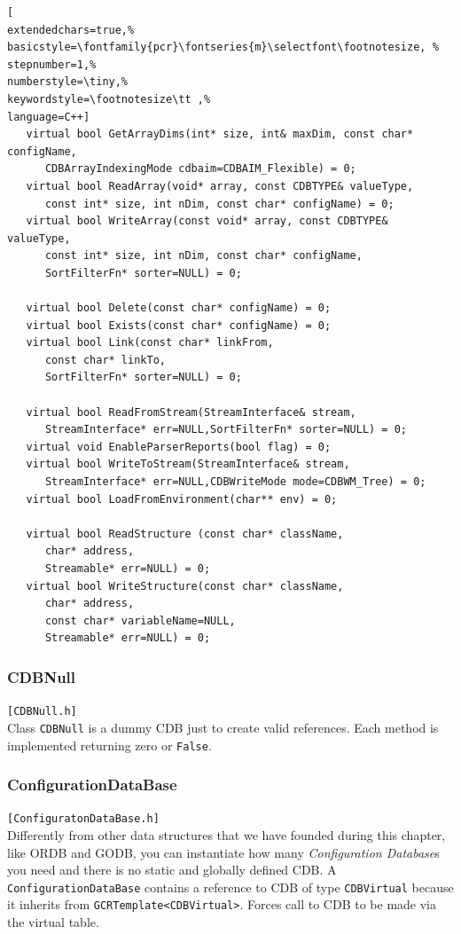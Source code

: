 \begin{lstlisting}[
extendedchars=true,%
basicstyle=\fontfamily{pcr}\fontseries{m}\selectfont\footnotesize, %
stepnumber=1,%
numberstyle=\tiny,%
keywordstyle=\footnotesize\tt ,%
language=C++]
   virtual bool GetArrayDims(int* size, int& maxDim, const char* configName,
      CDBArrayIndexingMode cdbaim=CDBAIM_Flexible) = 0;
   virtual bool ReadArray(void* array, const CDBTYPE& valueType,
      const int* size, int nDim, const char* configName) = 0;
   virtual bool WriteArray(const void* array, const CDBTYPE& valueType,
      const int* size, int nDim, const char* configName, 
      SortFilterFn* sorter=NULL) = 0;

   virtual bool Delete(const char* configName) = 0;
   virtual bool Exists(const char* configName) = 0;
   virtual bool Link(const char* linkFrom,
      const char* linkTo,
      SortFilterFn* sorter=NULL) = 0;

   virtual bool ReadFromStream(StreamInterface& stream,
      StreamInterface* err=NULL,SortFilterFn* sorter=NULL) = 0;
   virtual void EnableParserReports(bool flag) = 0;
   virtual bool WriteToStream(StreamInterface& stream,
      StreamInterface* err=NULL,CDBWriteMode mode=CDBWM_Tree) = 0;
   virtual bool LoadFromEnvironment(char** env) = 0;

   virtual bool ReadStructure (const char* className,
      char* address,
      Streamable* err=NULL) = 0;
   virtual bool WriteStructure(const char* className,
      char* address,
      const char* variableName=NULL,
      Streamable* err=NULL) = 0;
\end{lstlisting}



\subsubsection{CDBNull}
\texttt{[CDBNull.h]}\\
Class \texttt{CDBNull} is a dummy CDB just to create valid references. Each method is implemented returning zero or \texttt{False}.



\subsubsection{ConfigurationDataBase}
\texttt{[ConfiguratonDataBase.h]}\\
Differently from other data structures that we have founded during this chapter, like ORDB and GODB, you can instantiate how many \textit{Configuration Database}s you need and there is no static and globally defined CDB. A \texttt{ConfigurationDataBase} contains a reference to CDB of type \texttt{CDBVirtual} because it inherits from \texttt{GCRTemplate<CDBVirtual>}. Forces call to CDB to be made via the virtual table. \\


